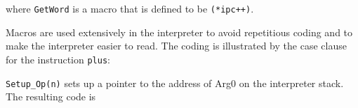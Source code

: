 \goodbreak
{}

\noindent
where \texttt{GetWord} is a macro that is defined to be \texttt{(*ipc++)}.

Macros are used extensively in the interpreter to avoid repetitious
coding and to make the interpreter easier to read.  The coding is
illustrated by the case clause for the instruction \texttt{plus}:

\goodbreak
{}



\texttt{Setup\_Op(n)} sets up a pointer to the address of Arg0 on the
interpreter stack. The resulting code is

